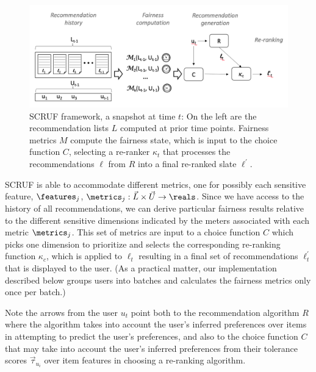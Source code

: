 \begin{figure}[tb]
    \centering
    \includegraphics[width=5.5in]{imgs/dynfair/process-graphic.png}
    \caption{SCRUF framework, a snapshot at time $t$: On the left are the recommendation lists $L$ computed at prior time points. Fairness metrics $M$ compute the fairness state, which is input to the choice function $C$, selecting a re-ranker $\kappa_t$ that processes the recommendations $\ell$ from $R$ into a final re-ranked slate $\ell^{\prime}$.}
    \label{fig:framework}
\end{figure}

SCRUF is able to accommodate different metrics, one for possibly each sensitive feature, $\features_j$, $\metrics_j: \vec{L} \times \vec{U} \rightarrow \reals$.  Since we have access to the history of all recommendations, we can derive particular fairness results relative to the different sensitive dimensions indicated by the meters associated with each metric $\metrics_j$. This set of metrics are input to a choice function $C$ which picks one dimension to prioritize and selects the corresponding re-ranking function $\kappa_c$, which is applied to $\ell_t$ resulting in a final set of recommendations $\ell^{\prime}_t$ that is displayed to the user. (As a practical matter, our implementation described below groups users into batches and calculates the fairness metrics only once per batch.)

Note the arrows from the user $u_t$ point both to the recommendation algorithm $R$ where the algorithm takes into account the user's inferred preferences over items in attempting to predict the user's preferences, and also to the choice function $C$ that may take into account the user's inferred preferences from their tolerance scores $\vec{\tau}_{u_i}$ over item features in choosing a re-ranking algorithm. 

